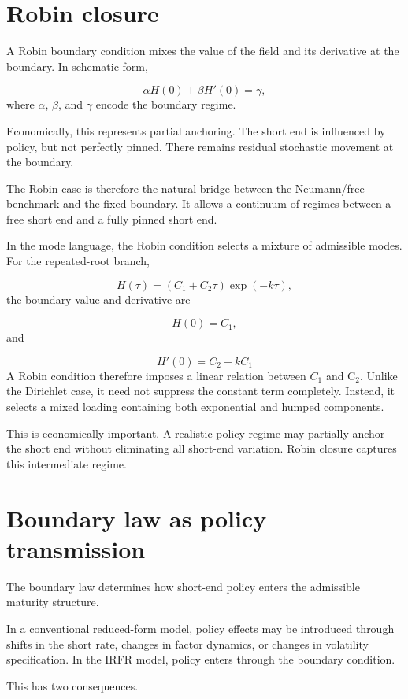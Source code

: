 \documentclass[11pt,oneside]{book}
\begin{document}
\section{Robin closure}\label{robin-closure}

A Robin boundary condition mixes the value of the field and its
derivative at the boundary. In schematic form,

\[
\alpha H(0)+\beta H'(0)=\gamma,
\]
where $\alpha$, $\beta$, and $\gamma$ encode the boundary regime.

Economically, this represents partial anchoring. The short end is
influenced by policy, but not perfectly pinned. There remains residual
stochastic movement at the boundary.

The Robin case is therefore the natural bridge between the Neumann/free
benchmark and the fixed boundary. It allows a continuum of regimes
between a free short end and a fully pinned short end.

In the mode language, the Robin condition selects a mixture of
admissible modes. For the repeated-root branch,

\[
H(\tau) = (C_1 + C_2\tau) \exp(-k\tau),
\]
the boundary value and derivative are

\[
H(0)=C_1,
\]
and

\[
H'(0)=C_2-kC_1
\]
A Robin condition therefore imposes a linear relation between $C_1$ and C$_2$.
Unlike the Dirichlet case, it need not suppress the constant term
completely. Instead, it selects a mixed loading containing both
exponential and humped components.

This is economically important. A realistic policy regime may partially
anchor the short end without eliminating all short-end variation. Robin
closure captures this intermediate regime.

\section{Boundary law as policy transmission}\label{boundary-law-as-policy-transmission}

The boundary law determines how short-end policy enters the admissible
maturity structure.

In a conventional reduced-form model, policy effects may be introduced
through shifts in the short rate, changes in factor dynamics, or changes
in volatility specification. In the IRFR model, policy enters through
the boundary condition.

This has two consequences.
\end{document}
